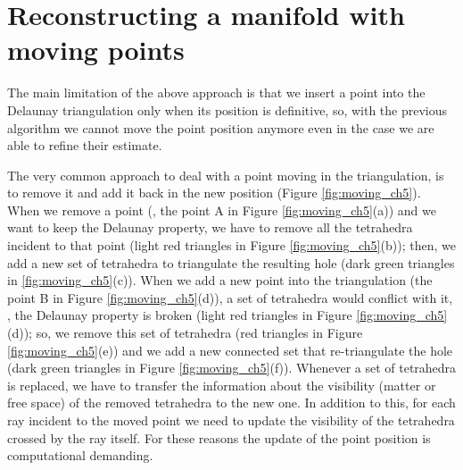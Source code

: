 \section{Reconstructing a manifold with moving points}
\label{sec:3D-Reconstruction_2}

The main limitation of the above approach is that we insert a point into the Delaunay triangulation only when its position is definitive, so, with the previous algorithm we cannot move the point position anymore even in the case we are able to refine their estimate. 

The very common approach to deal with a point moving in the triangulation, is to remove it and add it back in the new position \cite{cgal} (Figure \ref{fig:moving_ch5}). 
When we remove a point (\eg, the point A in Figure \ref{fig:moving_ch5}(a)) and we want to keep the Delaunay property, we have to remove all the tetrahedra incident to that point (light red triangles in Figure \ref{fig:moving_ch5}(b)); then, we add a new set of tetrahedra to triangulate the resulting hole (dark green triangles in \ref{fig:moving_ch5}(c)).
When we add a new point into the triangulation  (the point B in Figure \ref{fig:moving_ch5}(d)), a set of tetrahedra would conflict with it, \ie, the Delaunay property is broken (light red triangles in Figure \ref{fig:moving_ch5}(d)); so, we remove this set of tetrahedra  (red triangles in Figure \ref{fig:moving_ch5}(e)) and we add a new connected set that re-triangulate the hole (dark green triangles in Figure \ref{fig:moving_ch5}(f)).
Whenever a set of tetrahedra is replaced, we have to transfer the information about the visibility (matter or free space) of the removed tetrahedra to the new one. 
In addition to this, for each ray incident to the moved point we need to update the visibility of the tetrahedra crossed by the ray itself.
For these reasons the update of the point position is computational demanding.

